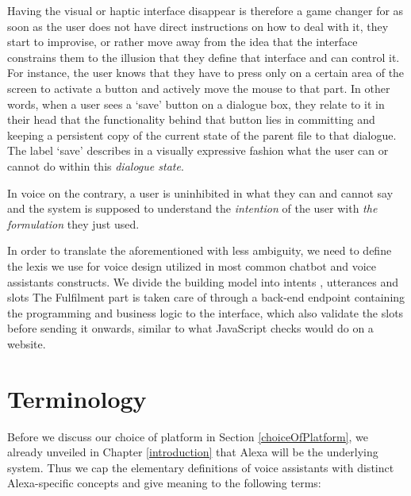 Having the visual or haptic interface disappear is therefore a game changer for as soon as the user does not have direct instructions on how to deal with it, they start to improvise, or rather move away from the idea that the interface constrains them to the illusion that they define that interface and can control it. For instance, the user knows that they have to press only on a certain area of the screen to activate a button and actively move the mouse to that part. 
In other words,
when a user sees a  `save' button on a dialogue box, they relate to it in their head that the functionality behind that button lies in committing and keeping a persistent copy of the current state of the parent file to that dialogue. The label `save' describes in a visually expressive fashion what the user can or cannot do within this \textit{dialogue state}.


%  

In voice on the contrary, a user is uninhibited in what they can and cannot say and the system is supposed to understand the \textit{intention}%
of the user with \textit{the formulation}%
they just used.

In order to translate the aforementioned with less ambiguity, we need to define the lexis we use for voice design utilized in most common chatbot and voice assistants constructs. 
We divide the building model into intents%
, utterances%
 and slots %
The Fulfilment part is taken care of through a back-end endpoint containing the programming and business logic to the interface, which also validate the slots before sending it onwards, similar to what JavaScript checks would do on a website. %

\section{Terminology}
Before we discuss our choice of platform in Section \ref{choiceOfPlatform}, we already unveiled in Chapter \ref{introduction} that Alexa will be the underlying system. Thus we cap the elementary definitions of voice assistants with distinct Alexa-specific concepts and give meaning to the following terms: 

